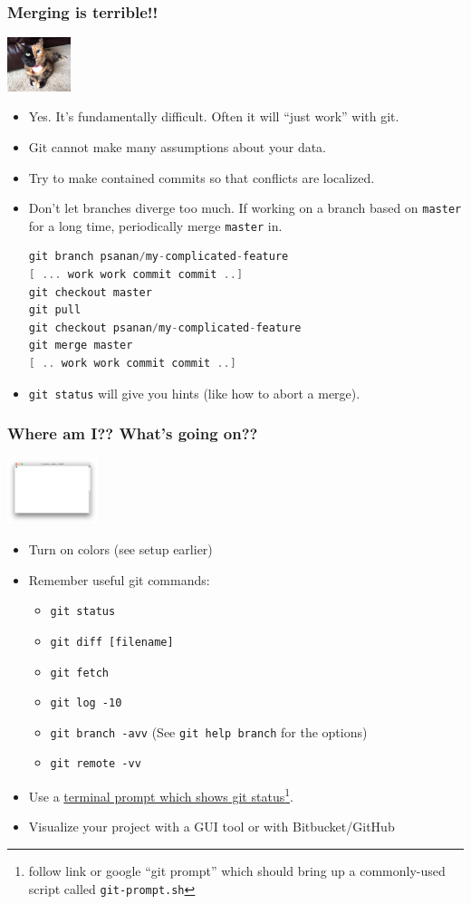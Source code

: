 \documentclass{beamer}
\begin{document}
\begin{frame}[fragile]
\frametitle{Merging is terrible!!}
\includegraphics[width=70px]{chimera.jpg}
\begin{itemize}
\item Yes. It's fundamentally difficult. Often it will ``just work'' with git.
\item Git cannot make many assumptions about your data.
\item Try to make contained commits so that conflicts are localized.
\item Don't let branches diverge too much. If working on a branch based on \texttt{master} for a long time, periodically merge \texttt{master} in.
\begin{lstlisting}[language=C++]
git branch psanan/my-complicated-feature
[ ... work work commit commit ..]
git checkout master
git pull
git checkout psanan/my-complicated-feature
git merge master
[ .. work work commit commit ..]
\end{lstlisting}
\item \lstinline{git status} will give you hints (like how to abort a merge).
\end{itemize}
\end{frame}

\begin{frame}[fragile]
\frametitle{Where am I?? What's going on??}
\includegraphics[width=100px]{term}
\begin{itemize}
\item Turn on colors (see setup earlier)
\item 
Remember useful git commands:
\begin{itemize}
\item \lstinline{git status}
\item \lstinline{git diff [filename]}
\item \lstinline{git fetch}
\item \lstinline{git log -10}
\item \lstinline{git branch -avv} (See \lstinline{git help branch} for the options)
\item \lstinline{git remote -vv}
\end{itemize}
\item Use a \href{https://raw.githubusercontent.com/git/git/master/contrib/completion/git-prompt.sh}{terminal prompt which shows git status}\footnote{follow link or google ``git prompt'' which should bring up a commonly-used script called \texttt{git-prompt.sh}}.
\item Visualize your project with a GUI tool or with Bitbucket/GitHub
\end{itemize}
\end{frame}
\end{document}
